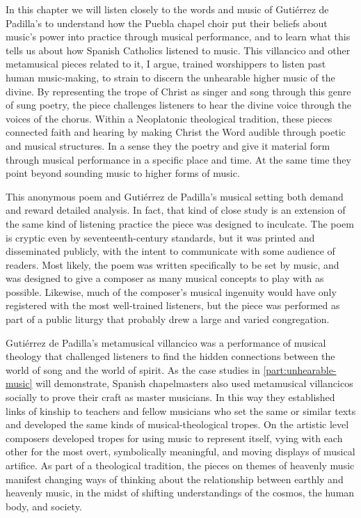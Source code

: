 In this chapter we will listen closely to the words and music of Gutiérrez de
Padilla's  to understand how the Puebla chapel
choir put their beliefs about music's power into practice through musical
performance, and to learn what this tells us about how Spanish Catholics
listened to music.
This villancico and other metamusical pieces related to it, I argue, trained
worshippers to listen past human music-making, to strain to discern the unhearable
higher music of the divine.
By representing the trope of Christ as singer and song through this genre of
sung poetry, the piece challenges listeners to hear the divine voice through the
voices of the chorus.
Within a Neoplatonic theological tradition, these pieces connected faith and
hearing by making Christ the Word audible through poetic and musical structures.
In a sense they  the poetry and give it material form through
musical performance in a specific place and time.
At the same time they point beyond sounding music to higher forms of music.

This anonymous poem and Gutiérrez de Padilla's musical setting both demand and
reward detailed analysis.
In fact, that kind of close study is an extension of the same kind of listening
practice the piece was designed to inculcate.
The poem is cryptic even by seventeenth-century standards, but it was printed
and disseminated publicly, with the intent to communicate with some audience of
readers.
Most likely, the poem was written specifically to be set by music, and was
designed to give a composer as many musical concepts to play with as possible.
Likewise, much of the composer's musical ingenuity would have only registered
with the most well-trained listeners, but the piece was performed as part of a
public liturgy that probably drew a large and varied congregation.

Gutiérrez de Padilla's metamusical villancico was a performance of musical
theology that challenged listeners to find the hidden connections between the
world of song and the world of spirit.
As the case studies in \cref{part:unhearable-music} will demonstrate, Spanish
chapelmasters also used metamusical villancicos socially to prove their craft
as master musicians.
In this way they established links of kinship to teachers and fellow musicians
who set the same or similar texts and developed the same kinds of
musical-theological tropes.
On the artistic level composers developed tropes for using music to represent
itself, vying with each other for the most overt, symbolically meaningful, and
moving displays of musical artifice.
As part of a theological tradition, the pieces on themes of heavenly music
manifest changing ways of thinking about the relationship between earthly and
heavenly music, in the midst of shifting understandings of the cosmos, the
human body, and society.

